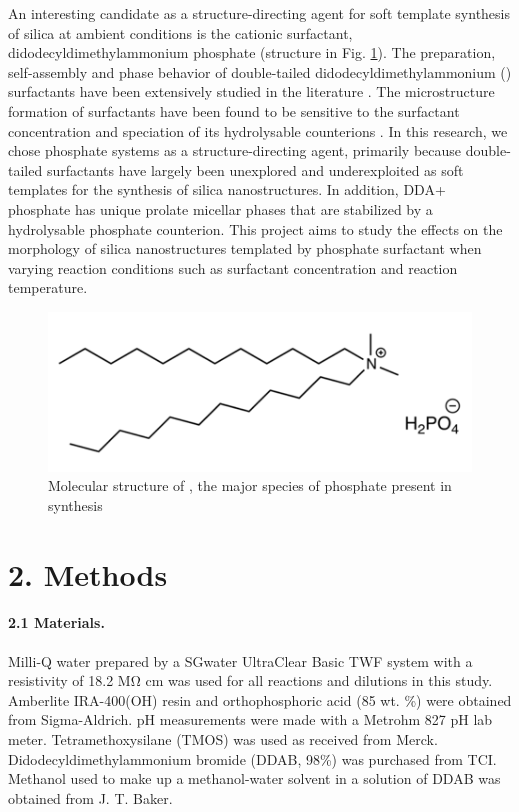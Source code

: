 \documentclass[a4paper,12pt,twocolumn]{article}
\begin{document}
An interesting candidate as a structure-directing agent for soft template synthesis of silica at ambient conditions is the cationic surfactant, didodecyldimethylammonium phosphate (structure in Fig. \ref{fig:structure}). The preparation, self-assembly and phase behavior of double-tailed didodecyldimethylammonium () surfactants have been extensively studied in the literature \cite{warr1988}. The microstructure formation of  surfactants have been found to be sensitive to the surfactant concentration and speciation of its hydrolysable counterions \cite{liu2014}. In this research, we chose  phosphate systems as a structure-directing agent, primarily because double-tailed surfactants have largely been unexplored and underexploited as soft templates for the synthesis of silica nanostructures. In addition, DDA+ phosphate has unique prolate micellar phases that are stabilized by a hydrolysable phosphate counterion. This project aims to study the effects on the morphology of silica nanostructures templated by  phosphate surfactant when varying reaction conditions such as surfactant concentration and reaction temperature.

	\begin{figure}[h]
		\includegraphics[width=\linewidth]{structure.png}
  		\caption{Molecular structure of , the major species of  phosphate present in synthesis}
  		\label{fig:structure}
  	\end{figure}
	 
	 \section{2. Methods}
	 
	 \paragraph{2.1 Materials.} Milli-Q water prepared by a SGwater UltraClear Basic TWF system with a resistivity of 18.2 MΩ cm was used for all reactions and dilutions in this study. Amberlite IRA-400(OH) resin and orthophosphoric acid (85 wt. \%) were obtained from Sigma-Aldrich. pH measurements were made with a Metrohm 827 pH lab meter. Tetramethoxysilane (TMOS) was used as received from Merck. Didodecyldimethylammonium bromide (DDAB, 98\%) was purchased from TCI. Methanol used to make up a methanol-water solvent in a solution of DDAB was obtained from J. T. Baker.
	 
\end{document}
